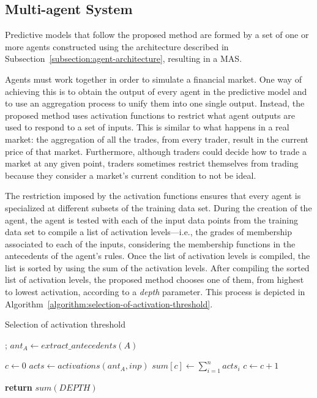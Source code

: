 ﻿\documentclass{ieeeaccess}
\begin{document}
\subsection{Multi-agent System}
\label{subsection:mult-agent-system}

Predictive models that follow the proposed method are formed by a set
of one or more agents constructed using the architecture described in
Subsection~\ref{subsection:agent-architecture}, resulting in a MAS.

Agents must work together in order to simulate a financial market. One
way of achieving this is to obtain the output of every agent in the
predictive model and to use an aggregation process to unify them into
one single output. Instead, the proposed method uses activation
functions to restrict what agent outputs are used to respond to a set
of inputs. This is similar to what happens in a real market: the
aggregation of all the trades, from every trader, result in the current
price of that market. Furthermore, although traders could decide how to trade a
market at any given point, traders sometimes restrict themselves from
trading because they consider a market's current condition to not be
ideal.

The restriction imposed by the activation functions ensures that every
agent is specialized at different subsets of the training data
set. During the creation of the agent, the agent is tested with
each of the input data points from the training data set to compile a
list of activation levels---i.e., the grades of membership associated
to each of the inputs, considering the membership functions in the
antecedents of the agent's rules. Once the list of activation levels
is compiled, the list is sorted by using the sum of the activation
levels. After compiling the sorted list of activation levels, the proposed
method chooses one of them, from highest to lowest activation,
according to a \textit{depth} parameter. This process is depicted in
Algorithm~\ref{algorithm:selection-of-activation-threshold}.

\begin{algorithm}
  \caption{Selection of activation threshold}
  \label{algorithm:selection-of-activation-threshold}
  \begin{algorithmic}[1]
    ;
    \State $ant_A\gets extract\_antecedents(A)$

    \State $c\gets 0$
    \State $acts \gets activations(ant_A, inp)$
    \State $sum[c] \gets \sum_{i = 1}^{n} acts_i$
    \State $c \gets c + 1$
    \EndFor

    \State \textbf{return} $sum(DEPTH)$
    \EndProcedure
  \end{algorithmic}
\end{algorithm}
\end{document}
